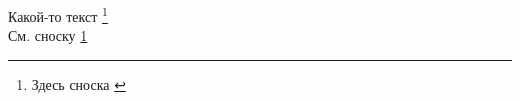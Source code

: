 \documentclass[a4paper, 12pt]{article}
\begin{document}
    Какой-то текст
    \footnote{Здесь сноска \label{footnote_1}}
    \\

    См. сноску \ref{footnote_1} %
\end{document}
